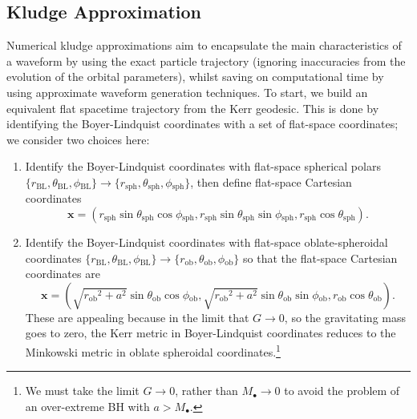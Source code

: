 \documentclass[a4paper, 11pt, titlepage, twoside]{report}
\newcommand{\sub}[1]{\ensuremath{_\mathrm{#1}}}
\begin{document}
\subsection{Kludge Approximation}

Numerical kludge approximations aim to encapsulate the main characteristics of a waveform by using the exact particle trajectory (ignoring inaccuracies from the evolution of the orbital parameters), whilst saving on computational time by using approximate waveform generation techniques. To start, we build an equivalent flat spacetime trajectory from the Kerr geodesic. This is done by identifying the Boyer-Lindquist coordinates with a set of flat-space coordinates; we consider two choices here:
\begin{enumerate}
\item Identify the Boyer-Lindquist coordinates with flat-space spherical polars \linebreak $\{r\sub{BL}, \theta\sub{BL}, \phi\sub{BL}\} \rightarrow \{r\sub{sph}, \theta\sub{sph}, \phi\sub{sph}\}$, then define flat-space Cartesian coordinates\cite{Gair2005, Babak2007}
\begin{equation}
\boldsymbol{x} = \left(r\sub{sph} \sin\theta\sub{sph}\cos\phi\sub{sph}, r\sub{sph} \sin\theta\sub{sph}\sin\phi\sub{sph}, r\sub{sph} \cos\theta\sub{sph}\right).
\end{equation}
\item Identify the Boyer-Lindquist coordinates with flat-space oblate-spheroidal coordinates $\{r\sub{BL}, \theta\sub{BL}, \phi\sub{BL}\} \rightarrow \{r\sub{ob}, \theta\sub{ob}, \phi\sub{ob}\}$ so that the flat-space Cartesian coordinates are
\begin{equation}
\boldsymbol{x} = \left(\sqrt{{r\sub{ob}}^2 + a^2} \sin\theta\sub{ob}\cos\phi\sub{ob}, \sqrt{{r\sub{ob}}^2 + a^2} \sin\theta\sub{ob}\sin\phi\sub{ob}, r\sub{ob} \cos\theta\sub{ob}\right).
\end{equation}
These are appealing because in the limit that $G \rightarrow 0$, so the gravitating mass goes to zero, the Kerr metric in Boyer-Lindquist coordinates reduces to the Minkowski metric in oblate spheroidal coordinates.\footnote{We must take the limit $G \rightarrow 0$, rather than $M_\bullet \rightarrow 0$ to avoid the problem of an over-extreme BH with $a > M_\bullet$.}
\end{enumerate}
\end{document}
